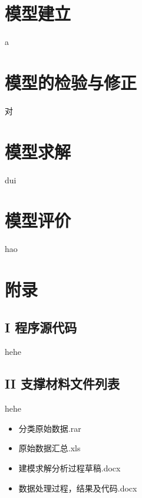 \documentclass{article}
\begin{document}
	\section{模型建立}
		a
	\section{模型的检验与修正}
		对
	\section{模型求解}
		dui
	\section{模型评价}
		hao
	
	
	\section*{附录}
	\subsection*{I 程序源代码}
		hehe
	\subsection*{II 支撑材料文件列表}
		hehe
	\begin{itemize}
		\item 分类原始数据.rar
		\item 原始数据汇总.xls
		\item 建模求解分析过程草稿.docx
		\item 数据处理过程，结果及代码.docx
	\end{itemize}
\end{document}
